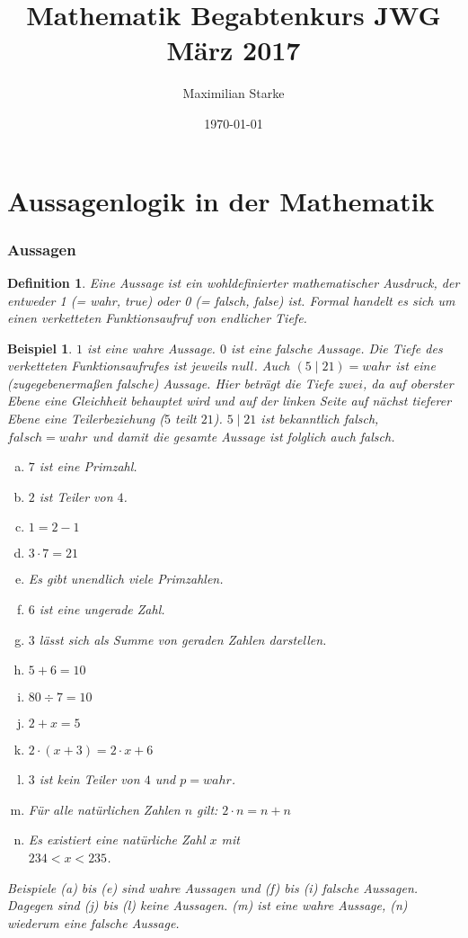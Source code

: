 \documentclass[a4paper]{article}
\title{Mathematik Begabtenkurs JWG März 2017}
\author{Maximilian Starke}
\date{\today}
\newtheorem{beispiel}[satz]{Beispiel}
\newtheorem{definition}[satz]{Definition} %
\theoremstyle{nonumberplain}
\begin{document}
\maketitle


\part{Aussagenlogik in der Mathematik}

\section{Aussagen}

\begin{definition}\label{d:aussage}
Eine Aussage ist ein wohldefinierter mathematischer Ausdruck, der entweder 1 (= wahr, true) oder 0 (= falsch, false) ist. Formal handelt es sich um einen verketteten Funktionsaufruf von endlicher Tiefe. 
\end{definition}

\begin{beispiel}
	$1$ ist eine wahre Aussage. $0$ ist eine falsche Aussage. Die Tiefe des verketteten Funktionsaufrufes ist jeweils $null$. Auch $(5\mid21) = wahr$ ist eine (zugegebenermaßen \textit{falsche}) Aussage. Hier beträgt die Tiefe $zwei$, da auf oberster Ebene eine Gleichheit behauptet wird und auf der linken Seite auf nächst tieferer Ebene eine Teilerbeziehung ($5$ teilt $21$). $5\mid21$ ist bekanntlich falsch, $falsch=wahr$ und damit die gesamte Aussage ist folglich auch falsch.
	
	\begin{multicols}{2}[]
		\begin{enumerate}[(a)]
			\item $7$ ist eine Primzahl.
			\item $2$ ist Teiler von $4$.
			\item $1=2-1$
			\item $3\cdot7=21$
			\item Es gibt unendlich viele Primzahlen.
			\item $6$ ist eine ungerade Zahl.
			\item $3$ lässt sich als Summe von geraden Zahlen darstellen.
			\item $5+6=10$
			\item $80\div7=10$
			\item $2+x=5$
			\item $2\cdot(x+3)=2\cdot x+6$
			\item $3$ ist kein Teiler von $4$ und $p=wahr$.
			\item Für alle natürlichen Zahlen $n$ gilt: $2\cdot n = n+n$
			\item Es existiert eine natürliche Zahl $x$ mit \\ ${234<x<235}$.
		\end{enumerate}
	\end{multicols}

Beispiele (a) bis (e) sind wahre Aussagen und (f) bis (i) falsche Aussagen. Dagegen sind (j) bis (l) keine Aussagen. (m) ist eine wahre Aussage, (n) wiederum eine falsche Aussage.
\end{beispiel}
\end{document}
